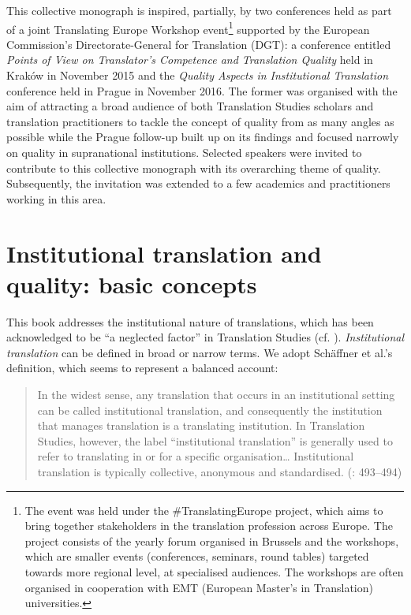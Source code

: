 \documentclass[output=paper]{langsci/langscibook}
\begin{document}
This collective monograph is inspired, partially, by two conferences held as part of a joint Translating Europe Workshop event\footnote{The event was held under the \#TranslatingEurope project, which aims to bring together stakeholders in the translation profession across Europe. The project consists of the yearly forum organised in Brussels and the workshops, which are smaller events (conferences, seminars, round tables) targeted towards more regional level, at specialised audiences. The workshops are often organised in cooperation with EMT (European Master's in Translation) universities.} supported by the European Commission’s Directorate-General for Translation (DGT): a conference entitled \textit{Points of View on Translator's Competence and Translation Quality} held in Kraków in  November 2015 and the \textit{Quality Aspects in Institutional Translation} conference held in Prague in  November 2016. The former was organised with the aim of attracting a broad audience of both Translation Studies scholars and translation practitioners to tackle the concept of quality from as many angles as possible while the Prague follow-up built up on its findings and focused narrowly on quality in supranational institutions. Selected speakers were invited to contribute to this collective monograph with its overarching theme of quality. Subsequently, the invitation was extended to a few academics and practitioners working in this area.

\section{Institutional translation and quality: basic concepts}

This book addresses the institutional nature of translations, which has been acknowledged to be “a neglected factor” in Translation Studies (cf. \citealt[470]{Mason2003[2004]}). \textit{Institutional translation} can be defined in broad or narrow terms. We adopt Schäffner et al.’s definition, which seems to represent a balanced account:

\begin{quote}
In the widest sense, any translation that occurs in an institutional setting can be called institutional translation, and consequently the institution that manages translation is a translating institution. In Translation Studies, however, the label ``institutional translation'' is generally used to refer to translating in or for a specific organisation… Institutional translation is typically collective, anonymous and standardised. (\citeyear{SchäffnerEtAl2014}: 493–494)
\end{quote}
\end{document}
